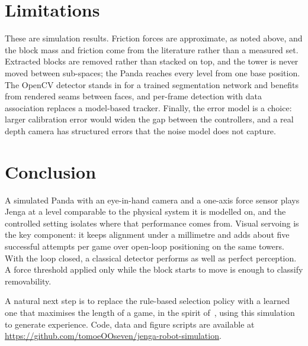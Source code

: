 \documentclass[conference]{IEEEtran}
\begin{document}
\section{Limitations}

These are simulation results. Friction forces are approximate, as noted above, and
the block mass and friction come from the literature rather than a measured set.
Extracted blocks are removed rather than stacked on top, and the tower is never moved
between sub-spaces; the Panda reaches every level from one base position. The OpenCV
detector stands in for a trained segmentation network and benefits from rendered
seams between faces, and per-frame detection with data association replaces a
model-based tracker. Finally, the error model is a choice: larger calibration error
would widen the gap between the controllers, and a real depth camera has structured
errors that the noise model does not capture.

\section{Conclusion}

A simulated Panda with an eye-in-hand camera and a one-axis force sensor plays Jenga
at a level comparable to the physical system it is modelled on, and the controlled
setting isolates where that performance comes from. Visual servoing is the key
component: it keeps alignment under a millimetre and adds about five successful
attempts per game over open-loop positioning on the same towers. With the loop
closed, a classical detector performs as well as perfect perception. A force threshold
applied only while the block starts to move is enough to classify removability.

A natural next step is to replace the rule-based selection policy with a learned one
that maximises the length of a game, in the spirit of~\cite{bauza2017,fazeli2019},
using this simulation to generate experience. Code, data and figure scripts are
available at \url{https://github.com/tomoeOOseven/jenga-robot-simulation}.
\end{document}
